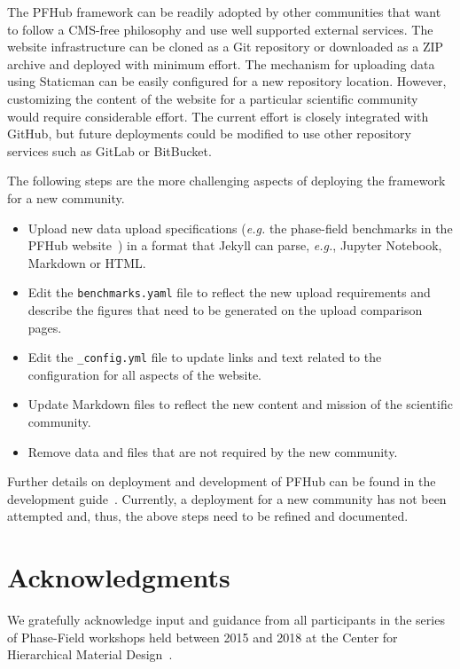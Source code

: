 \documentclass{jors}
\begin{document}
The PFHub framework can be readily adopted by other communities that
want to follow a CMS-free philosophy and use well supported external
services. The website infrastructure can be cloned as a Git repository
or downloaded as a ZIP archive and deployed with minimum effort. The
mechanism for uploading data using Staticman can be easily configured
for a new repository location. However, customizing the content of the
website for a particular scientific community would require
considerable effort. The current effort is closely integrated with
GitHub, but future deployments could be modified to use other
repository services such as GitLab or BitBucket.

The following steps are the more challenging
aspects of deploying the framework for a new community.

\begin{itemize}
  \item Upload new data upload specifications (\emph{e.g.} the
    phase-field benchmarks in the PFHub website~\cite{pfhub}) in a
    format that Jekyll can parse, \emph{e.g.}, Jupyter Notebook,
    Markdown or HTML.
  \item Edit the \texttt{benchmarks.yaml} file to reflect the new
    upload requirements and describe the figures that need to be
    generated on the upload comparison pages.
  \item Edit the \texttt{\_config.yml} file to update links and text
    related to the configuration for all aspects of the website.
  \item Update Markdown files to reflect the new content and mission
    of the scientific community.
  \item Remove data and files that are not required by the new
    community.
\end{itemize}

Further details on deployment and development of PFHub can be found in
the development guide~\cite{development_guide}.  Currently, a
deployment for a new community has not been attempted and, thus, the
above steps need to be refined and documented.

\section*{Acknowledgments}

We gratefully acknowledge input and guidance from all participants in
the series of Phase-Field workshops held between 2015 and 2018 at the
Center for Hierarchical Material Design~\cite{workshops}.
\end{document}
